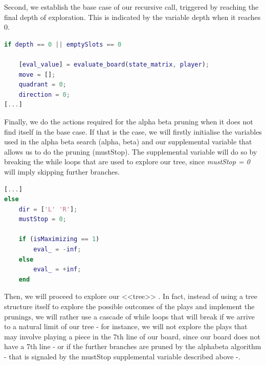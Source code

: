 \vspace{10pt}

Second, we establish the base case of our recursive call, triggered by reaching
the final depth of exploration. This is indicated by the variable depth when it
reaches 0.

\vspace{10pt}

\begin{lstlisting}[language=Matlab]
if depth == 0 || emptySlots == 0
    
    [eval_value] = evaluate_board(state_matrix, player);
    move = [];
    quadrant = 0;
    direction = 0;
[...]
\end{lstlisting}

\vspace{10pt}

Finally, we do the actions required for the alpha beta pruning when it does not
find itself in the base case. If that is the case, we will firstly initialise
the variables used in the alpha beta search (alpha, beta) and our supplemental
variable that allows us to do the pruning (mustStop). The supplemental variable
will do so by breaking the while loops that are used to explore our tree, since
\textit{mustStop = 0} will imply skipping further branches.

\vspace{10pt}

\begin{lstlisting}[language=Matlab]
[...]
else   
    dir = ['L' 'R'];
    mustStop = 0;
    
    if (isMaximizing == 1)
        eval_ = -inf;
    else
        eval_ = +inf;
    end
\end{lstlisting}

\vspace{10pt}

Then, we will proceed to explore our <<tree>> . In fact, instead of using a tree
structure itself to explore the possible outcomes of the plays and implement
the prunings, we will rather use a cascade of while loops that will break if we
arrive to a natural limit of our tree - for instance, we will not explore the
plays that may involve playing a piece in the 7th line of our board, since our
board does not have a 7th line - or if the further branches are pruned by the
alphabeta algorithm  - that is signaled by the mustStop supplemental variable
described above -.

\vspace{10pt}

